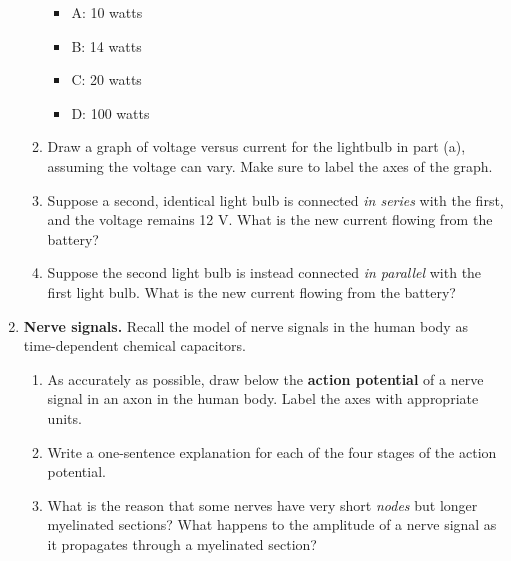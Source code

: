 \documentclass[10pt]{article}
\begin{document}
\begin{enumerate}
\begin{enumerate}
\begin{itemize}
\item A: 10 watts
\item B: 14 watts
\item C: 20 watts
\item D: 100 watts
\end{itemize}
\vspace{1cm}
\item Draw a graph of voltage versus current for the lightbulb in part (a), assuming the voltage can vary.  Make sure to label the axes of the graph. \\ \vspace{3cm}
\item Suppose a second, identical light bulb is connected \textit{in series} with the first, and the voltage remains 12 V.  What is the new current flowing from the battery? \\ \vspace{1cm}
\item Suppose the second light bulb is instead connected \textit{in parallel} with the first light bulb.  What is the new current flowing from the battery? \\ \vspace{1cm}
\end{enumerate}
\item \textbf{Nerve signals.} Recall the model of nerve signals in the human body as time-dependent chemical capacitors.
\begin{enumerate}
\item As accurately as possible, draw below the \textbf{action potential} of a nerve signal in an axon in the human body.  Label the axes with appropriate units. \\ \vspace{4cm}
\item Write a one-sentence explanation for each of the four stages of the action potential. \\ \vspace{2cm}
\item What is the reason that some nerves have very short \textit{nodes} but longer myelinated sections?  What happens to the amplitude of a nerve signal as it propagates through a myelinated section?
\end{enumerate}
\end{enumerate}
\end{document}
